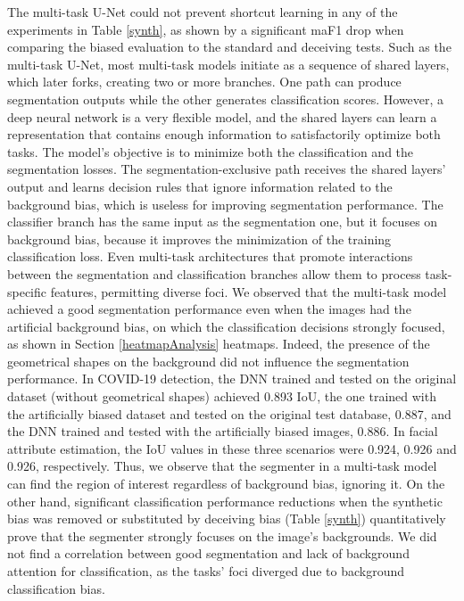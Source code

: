 \documentclass[fleqn,10pt]{wlscirep}
\begin{document}
{The multi-task U-Net could not prevent shortcut learning in any of the experiments in Table \ref{synth}, as shown by a significant maF1 drop when comparing the biased evaluation to the standard and deceiving tests. Such as the multi-task U-Net, most multi-task models initiate as a sequence of shared layers, which later forks, creating two or more branches. One path can produce segmentation outputs while the other generates classification scores. However, a deep neural network is a very flexible model, and the shared layers can learn a representation that contains enough information to satisfactorily optimize both tasks. The model's objective is to minimize both the classification and the segmentation losses. The segmentation-exclusive path receives the shared layers' output and learns decision rules that ignore information related to the background bias, which is useless for improving segmentation performance. The classifier branch has the same input as the segmentation one, but it focuses on background bias, because it improves the minimization of the training classification loss. Even multi-task architectures that promote interactions between the segmentation and classification branches\cite{MultiTask1} allow them to process task-specific features, permitting diverse foci. We observed that the multi-task model achieved a good segmentation performance even when the images had the artificial background bias, on which the classification decisions strongly focused, as shown in Section \ref{heatmapAnalysis} heatmaps. Indeed, the presence of the geometrical shapes on the background did not influence the segmentation performance. In COVID-19 detection, the DNN trained and tested on the original dataset (without geometrical shapes) achieved 0.893 IoU, the one trained with the artificially biased dataset and tested on the original test database, 0.887, and the DNN trained and tested with the artificially biased images, 0.886. In facial attribute estimation, the IoU values in these three scenarios were 0.924, 0.926 and 0.926, respectively. Thus, we observe that the segmenter in a multi-task model can find the region of interest regardless of background bias, ignoring it. On the other hand, significant classification performance reductions when the synthetic bias was removed or substituted by deceiving bias (Table \ref{synth}) quantitatively prove that the segmenter strongly focuses on the image's backgrounds. We did not find a correlation between good segmentation and lack of background attention for classification, as the tasks' foci diverged due to background classification bias.

}
\end{document}
